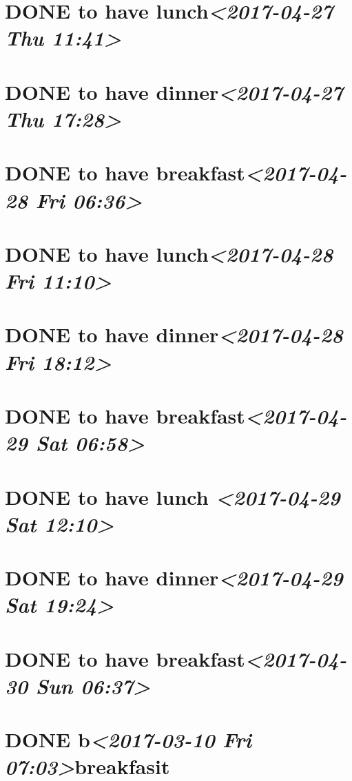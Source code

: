 \documentclass[cyan]{elegantnote}
\begin{document}
\section{{\bfseries\sffamily DONE} to have lunch\textit{<2017-04-27 Thu 11:41>}}
\label{sec:org1b44974}
\section{{\bfseries\sffamily DONE} to have dinner\textit{<2017-04-27 Thu 17:28>}}
\label{sec:orgc249f5d}
\section{{\bfseries\sffamily DONE} to have breakfast\textit{<2017-04-28 Fri 06:36>}}
\label{sec:orga5012ba}
\section{{\bfseries\sffamily DONE} to have lunch\textit{<2017-04-28 Fri 11:10>}}
\label{sec:org46f7bf5}
\section{{\bfseries\sffamily DONE} to have dinner\textit{<2017-04-28 Fri 18:12>}}
\label{sec:org46a9ee8}
\section{{\bfseries\sffamily DONE} to have breakfast\textit{<2017-04-29 Sat 06:58>}}
\label{sec:orgd0d0c0f}
\section{{\bfseries\sffamily DONE} to have lunch \textit{<2017-04-29 Sat 12:10>}}
\label{sec:orgcf8f20f}
\section{{\bfseries\sffamily DONE} to have dinner\textit{<2017-04-29 Sat 19:24>}}
\label{sec:orga1dbf6b}
\section{{\bfseries\sffamily DONE} to have breakfast\textit{<2017-04-30 Sun 06:37>}}
\label{sec:orgafced23}
\section{{\bfseries\sffamily DONE} b\textit{<2017-03-10 Fri 07:03>}breakfasit}
\label{sec:orgbe7a45b}
\end{document}

